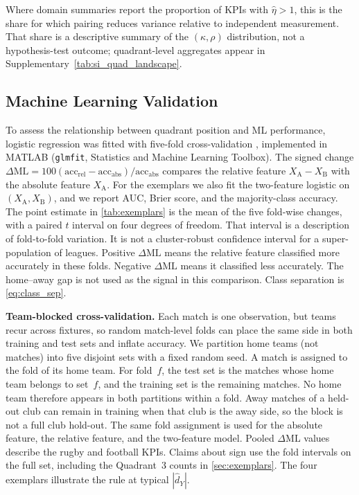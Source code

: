 Where domain summaries report the proportion of KPIs with $\hat\eta>1$, this is the share for which pairing reduces variance relative to independent measurement. That share is a descriptive summary of the $(\kappa,\rho)$ distribution, not a hypothesis-test outcome; quadrant-level aggregates appear in Supplementary~\cref{tab:si_quad_landscape}.

\subsection{Machine Learning Validation}
\label{sec:ml_cv}

To assess the relationship between quadrant position and ML performance, logistic regression was fitted with five-fold cross-validation \parencite{kohavi1995}, implemented in {MATLAB} (\texttt{glmfit}, Statistics and Machine Learning Toolbox). The signed change $\Delta\mathrm{ML}=100(\mathrm{acc}_{\mathrm{rel}}-\mathrm{acc}_{\mathrm{abs}})/\mathrm{acc}_{\mathrm{abs}}$ compares the relative feature $X_{\mathrm{A}}-X_{\mathrm{B}}$ with the absolute feature $X_{\mathrm{A}}$. For the exemplars we also fit the two-feature logistic on $(X_{\mathrm{A}},X_{\mathrm{B}})$, and we report AUC, Brier score, and the majority-class accuracy. The point estimate in \cref{tab:exemplars} is the mean of the five fold-wise changes, with a paired $t$ interval on four degrees of freedom. That interval is a description of fold-to-fold variation. It is not a cluster-robust confidence interval for a super-population of leagues. Positive $\Delta\mathrm{ML}$ means the relative feature classified more accurately in these folds. Negative $\Delta\mathrm{ML}$ means it classified less accurately. The home--away gap is not used as the signal in this comparison. Class separation is \cref{eq:class_sep}.

\textbf{Team-blocked cross-validation.} Each match is one observation, but teams recur across fixtures, so random match-level folds can place the same side in both training and test sets and inflate accuracy. We partition home teams (not matches) into five disjoint sets with a fixed random seed. A match is assigned to the fold of its home team. For fold~$f$, the test set is the matches whose home team belongs to set~$f$, and the training set is the remaining matches. No home team therefore appears in both partitions within a fold. Away matches of a held-out club can remain in training when that club is the away side, so the block is not a full club hold-out. The same fold assignment is used for the absolute feature, the relative feature, and the two-feature model. Pooled $\Delta\mathrm{ML}$ values describe the rugby and football KPIs. Claims about sign use the fold intervals on the full set, including the Quadrant~3 counts in \cref{sec:exemplars}. The four exemplars illustrate the rule at typical $|\hat d_Y|$.


